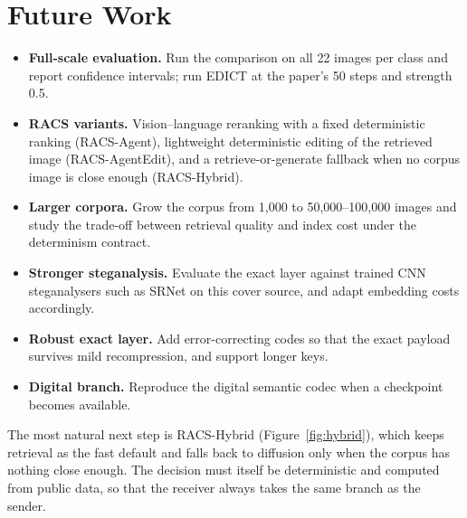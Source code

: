 \section{Future Work}
\begin{itemize}
	\item \textbf{Full-scale evaluation.} Run the comparison on all 22 images per class and report
	confidence intervals; run EDICT at the paper's 50 steps and strength 0.5.
	\item \textbf{RACS variants.} Vision--language reranking with a fixed deterministic ranking
	(RACS-Agent), lightweight deterministic editing of the retrieved image (RACS-AgentEdit), and a
	retrieve-or-generate fallback when no corpus image is close enough (RACS-Hybrid).
	\item \textbf{Larger corpora.} Grow the corpus from 1{,}000 to 50{,}000--100{,}000 images and
	study the trade-off between retrieval quality and index cost under the determinism contract.
	\item \textbf{Stronger steganalysis.} Evaluate the exact layer against trained CNN
	steganalysers such as SRNet on this cover source, and adapt embedding costs accordingly.
	\item \textbf{Robust exact layer.} Add error-correcting codes so that the exact payload
	survives mild recompression, and support longer keys.
	\item \textbf{Digital branch.} Reproduce the digital semantic codec when a checkpoint becomes
	available.
\end{itemize}

The most natural next step is RACS-Hybrid (Figure~\ref{fig:hybrid}), which keeps retrieval as the
fast default and falls back to diffusion only when the corpus has nothing close enough. The
decision must itself be deterministic and computed from public data, so that the receiver always
takes the same branch as the sender.


